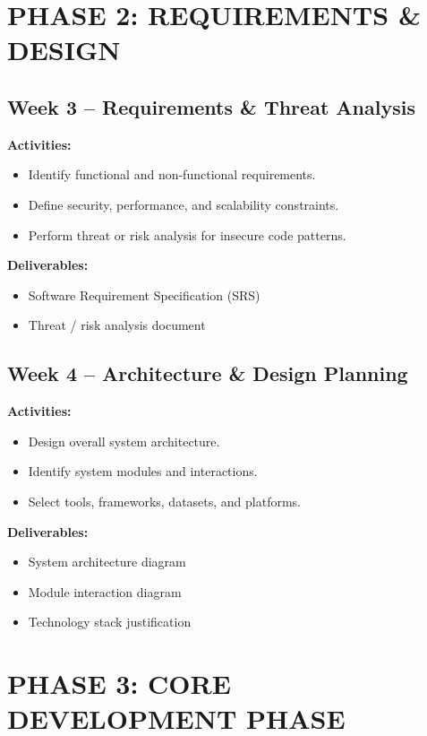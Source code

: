 \documentclass[12pt,a4paper]{article}
\begin{document}
\section*{PHASE 2: REQUIREMENTS \& DESIGN}

\subsection*{Week 3 -- Requirements \& Threat Analysis}
\textbf{Activities:}
\begin{itemize}[noitemsep]
    \item Identify functional and non-functional requirements.
    \item Define security, performance, and scalability constraints.
    \item Perform threat or risk analysis for insecure code patterns.
\end{itemize}
\textbf{Deliverables:}
\begin{itemize}[noitemsep]
    \item Software Requirement Specification (SRS)
    \item Threat / risk analysis document
\end{itemize}

\subsection*{Week 4 -- Architecture \& Design Planning}
\textbf{Activities:}
\begin{itemize}[noitemsep]
    \item Design overall system architecture.
    \item Identify system modules and interactions.
    \item Select tools, frameworks, datasets, and platforms.
\end{itemize}
\textbf{Deliverables:}
\begin{itemize}[noitemsep]
    \item System architecture diagram
    \item Module interaction diagram
    \item Technology stack justification
\end{itemize}

\section*{PHASE 3: CORE DEVELOPMENT PHASE}
\end{document}
